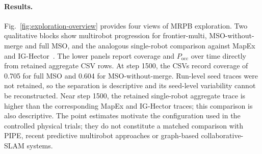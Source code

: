 \documentclass[11pt]{article}
\begin{document}
\paragraph{Results.} Fig.~\ref{fig:exploration-overview} provides four views of MRPB exploration. Two qualitative blocks show multirobot progression for frontier-multi, MSO-without-merge and full MSO, and the analogous single-robot comparison against MapEx~\citep{ho2024mapex} and IG-Hector~\citep{shrestha2019learned}. The lower panels report coverage and $P_{\mathrm{occ}}$ over time directly from retained aggregate CSV rows. At step 1500, the CSVs record coverage of 0.705 for full MSO and 0.604 for MSO-without-merge. Run-level seed traces were not retained, so the separation is descriptive and its seed-level variability cannot be reconstructed. Near step 1500, the retained single-robot aggregate trace is higher than the corresponding MapEx and IG-Hector traces; this comparison is also descriptive. The point estimates motivate the configuration used in the controlled physical trials; they do not constitute a matched comparison with PIPE, recent predictive multirobot approaches or graph-based collaborative-SLAM systems.
\end{document}
